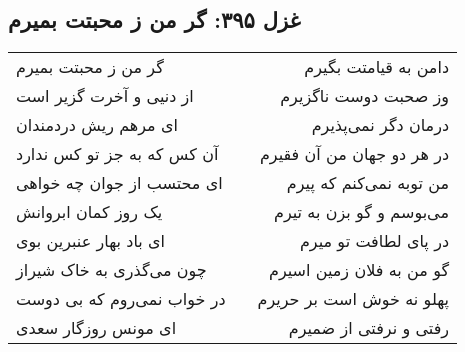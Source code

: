 \begin{center}
\section*{غزل ۳۹۵: گر من ز محبتت بمیرم}
\label{sec:395}
\begin{longtable}{l p{0.5cm} r}
گر من ز محبتت بمیرم
&&
دامن به قیامتت بگیرم
\\
از دنیی و آخرت گزیر است
&&
وز صحبت دوست ناگزیرم
\\
ای مرهم ریش دردمندان
&&
درمان دگر نمی‌پذیرم
\\
آن کس که به جز تو کس ندارد
&&
در هر دو جهان من آن فقیرم
\\
ای محتسب از جوان چه خواهی
&&
من توبه نمی‌کنم که پیرم
\\
یک روز کمان ابروانش
&&
می‌بوسم و گو بزن به تیرم
\\
ای باد بهار عنبرین بوی
&&
در پای لطافت تو میرم
\\
چون می‌گذری به خاک شیراز
&&
گو من به فلان زمین اسیرم
\\
در خواب نمی‌روم که بی دوست
&&
پهلو نه خوش است بر حریرم
\\
ای مونس روزگار سعدی
&&
رفتی و نرفتی از ضمیرم
\\
\end{longtable}
\end{center}
